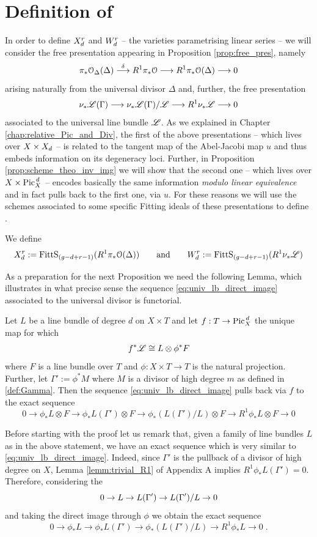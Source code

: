 \section{Definition of \modu}\label{sec:defi_modu}
	In order to define $X_d^r$ and $W_d^r$ -- the varieties parametrising linear series -- we will consider the free presentation appearing in Proposition \ref{prop:free_pres}, namely
	$$ 
	\pi_* \mathcal{O}_{\Delta}(\Delta)\overset{\delta}{\longrightarrow} R^1 \pi_* \mathcal{O} \longrightarrow R^1 \pi_* \mathcal{O}(\Delta) \longrightarrow 0 
	$$
	arising naturally from the universal divisor $\Delta$ and, further, the free presentation
	$$ 
	\nu_{*} \mathscr{L}(\Gamma)\longrightarrow \nu_{*} \mathscr{L}(\Gamma) / \mathscr{L} \longrightarrow R^1 \nu_{*} \mathscr{L} \longrightarrow 0
	$$
	associated to the universal line bundle $\mathscr{L}$.
	As we explained in Chapter \ref{chap:relative_Pic_and_Div}, the first of the above presentations -- which lives over $X\times X_d$ -- is related to the tangent map of the Abel-Jacobi map $u$ and thus embeds information on its degeneracy loci. 
	Further, in Proposition \ref{prop:scheme_theo_inv_img} we will show that the second one -- which lives over $X\times \operatorname{Pic}^{\,d}_X$ -- encodes basically the same information \emph{modulo linear equivalence} and in fact pulls back to the first one, via $u$. 
	For these reasons we will use the schemes associated to some specific Fitting ideals of these presentations to define \modu.
	\begin{defi}
		We define
		$$ X_d^r := \operatorname{FittS}_{(g-d+r-1)}(R^1\pi_* \mathcal{O}(\Delta)) \qquad \text{and} \qquad  W_d^r := \operatorname{FittS}_{(g-d+r-1)}(R^1\nu_{*} \mathscr{L}) $$
	\end{defi}
	As a preparation for the next Proposition we need the following Lemma, which illustrates in what precise sense the sequence \eqref{eq:univ_lb_direct_image} associated to the universal divisor is functorial.
	\begin{lemm}\label{lemm:functoriality}
		Let $L$ be a line bundle of degree $d$ on $X\times T$ and let $f:T\to \operatorname{Pic}^{\,d}_X$ the unique map for which
		$$ f^*\mathscr{L} \cong L \otimes \phi^* F $$
		where $F$ is a line bundle over $T$ and $\phi: X\times T \to T$ is the natural projection. Further, let $\Gamma':= \phi^* M$ where $M$ is a divisor of high degree $m$ as defined in \ref{def:Gamma}.
		Then the sequence \eqref{eq:univ_lb_direct_image} pulls back via $f$ to the exact sequence
		$$ 0 \to \phi_*L\otimes F  \to \phi_* L(\Gamma')\otimes F \to \phi_* (L(\Gamma') / L)\otimes F  \to R^1 \phi_* L\otimes F  \to 0 $$ 
	\end{lemm}
	\begin{rema}
		Before starting with the proof let us remark that, given a family of line bundles $L$ as in the above statement, we have an exact sequence which is very similar to \eqref{eq:univ_lb_direct_image}. Indeed, since $\Gamma'$ is the pullback of a divisor of high degree on $X$, Lemma \ref{lemm:trivial_R1} of Appendix A implies $R^1\phi_* L(\Gamma') = 0$. Therefore, considering the \ses 
		$$ 0 \to L \to L(\Gamma') \to L(\Gamma')/L \to 0 $$
		and taking the direct image through $\phi$ we obtain the exact sequence
		$$ 0 \to \phi_*L  \to \phi_* L(\Gamma') \to \phi_* (L(\Gamma') / L)  \to R^1 \phi_* L  \to 0\;. $$
	\end{rema}
